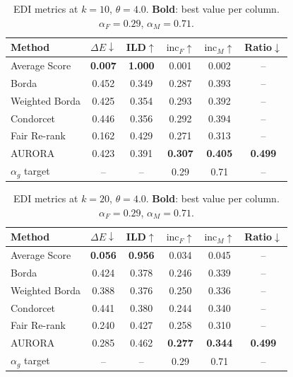 \documentclass[runningheads]{llncs}
\begin{document}
\begin{table}[h!]
\centering
\caption{EDI metrics at $k=10$, $\theta=4.0$. \textbf{Bold}: best value
per column. $\alpha_F=0.29$, $\alpha_M=0.71$.}
\label{tab:k10}
\begin{tabular}{lccccc}
\hline
Method & $\Delta E\downarrow$ & ILD$\uparrow$ & $\mathrm{inc}_F\uparrow$
       & $\mathrm{inc}_M\uparrow$ & Ratio$\downarrow$ \\
\hline
Average Score & \textbf{0.007} & \textbf{1.000} & 0.001 & 0.002 & -- \\
Borda         & 0.452 & 0.349 & 0.287 & 0.393 & -- \\
Weighted Borda & 0.425 & 0.354 & 0.293 & 0.392 & -- \\
Condorcet     & 0.446 & 0.356 & 0.292 & 0.394 & -- \\
Fair Re-rank  & 0.162 & 0.429 & 0.271 & 0.313 & -- \\
AURORA          & 0.423 & 0.391 & \textbf{0.307} & \textbf{0.405} & \textbf{0.499} \\
\hline
$\alpha_g$ target & -- & -- & 0.29 & 0.71 & -- \\
\hline
\end{tabular}
\end{table}

\begin{table}[h!]
\centering
\caption{EDI metrics at $k=20$, $\theta=4.0$. \textbf{Bold}: best value
per column. $\alpha_F=0.29$, $\alpha_M=0.71$.}
\label{tab:k20}
\begin{tabular}{lccccc}
\hline
Method & $\Delta E\downarrow$ & ILD$\uparrow$ & $\mathrm{inc}_F\uparrow$
       & $\mathrm{inc}_M\uparrow$ & Ratio$\downarrow$ \\
\hline
Average Score & \textbf{0.056} & \textbf{0.956} & 0.034 & 0.045 & -- \\
Borda         & 0.424 & 0.378 & 0.246 & 0.339 & -- \\
Weighted Borda & 0.388 & 0.376 & 0.250 & 0.336 & -- \\
Condorcet     & 0.441 & 0.380 & 0.244 & 0.340 & -- \\
Fair Re-rank  & 0.240 & 0.427 & 0.258 & 0.310 & -- \\
AURORA          & 0.285 & 0.462 & \textbf{0.277} & \textbf{0.344}
              & \textbf{0.499} \\
\hline
$\alpha_g$ target & -- & -- & 0.29 & 0.71 & -- \\
\hline
\end{tabular}
\end{table}
\end{document}
